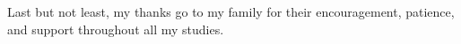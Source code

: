 Last but not least, my thanks go to my family for their encouragement, patience, and support throughout all my studies.


